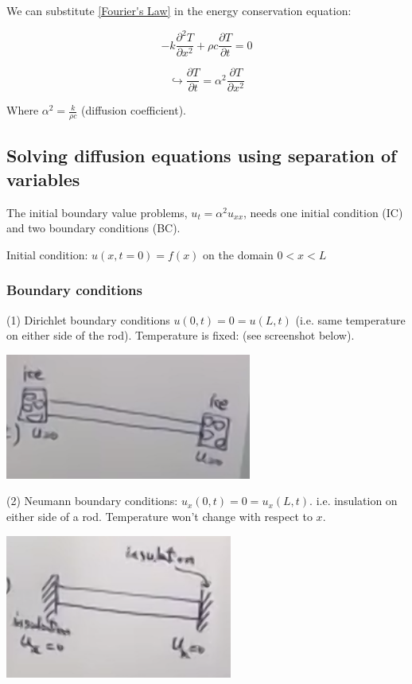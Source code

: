 \documentclass{article}
\begin{document}
We can substitute \ref{Fourier's Law} in the energy conservation equation:

$$-k \frac{\partial^2 T}{\partial x^2} + \rho c \frac{\partial T}{\partial t} = 0$$

$$\hookrightarrow \frac{\partial T}{\partial t} = \alpha^2 \frac{\partial T}{\partial x^2}$$

Where $\alpha^2 = \frac{k}{\rho c}$ (diffusion coefficient). 

\subsection{Solving diffusion equations using separation of variables}

The initial boundary value problems, $u_t = \alpha^2 u_{xx}$, needs one initial condition (IC) and two boundary conditions (BC). 

Initial condition: $u(x,t = 0) = f(x)$ on the domain $0 < x < L$

\subsubsection{Boundary conditions}

(1) Dirichlet boundary conditions $u(0,t) = 0 = u(L,t)$ (i.e. same temperature on either side of the rod). Temperature is fixed: (see screenshot below). 

\includegraphics[width = 0.5 \textwidth]{image4.png}

(2) Neumann boundary conditions: $u_x (0,t) = 0 = u_x (L,t)$. i.e. insulation on either side of a rod. Temperature won't change with respect to $x$. 

\includegraphics[width = 0.5 \textwidth]{image5.png}
\end{document}
